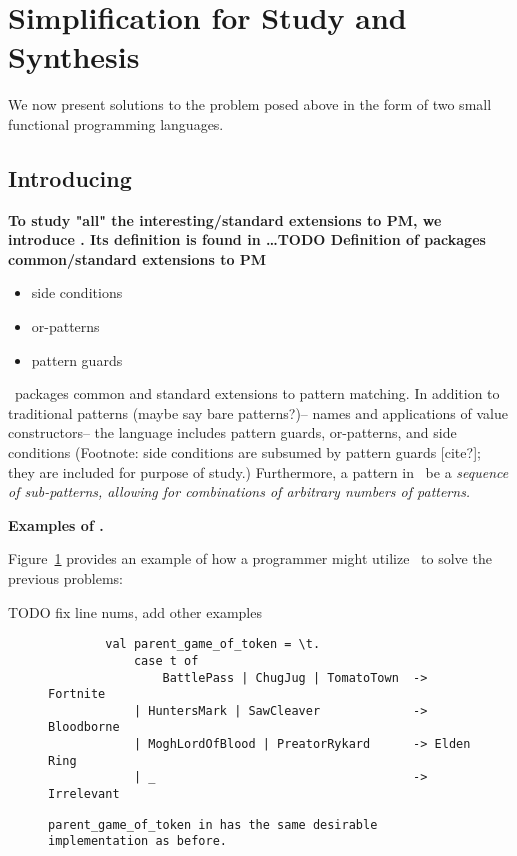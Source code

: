 \documentclass[manuscript,screen,review, 12pt]{acmart}
\begin{document}
\section{Simplification for Study and Synthesis}

We now present solutions to the problem posed above in the form of two small
functional programming languages. %

\subsection{Introducing \PPlus\ }

\begin{outline}[enumerate]
    \1 \bf{To study "all" the interesting/standard extensions to PM, we introduce}
    \PPlus. Its definition is found in \dots TODO 
    \2 \bf{Definition of \PPlus}
    \2 \bf{{\PPlus} packages common/standard extensions to PM}
    \begin{itemize}
        \item side conditions
        \item or-patterns 
        \item pattern guards 
    \end{itemize}

    \PPlus\ packages common and standard extensions to pattern matching. In
    addition to traditional patterns (maybe say bare patterns?)-- names and
    applications of value constructors-- the language includes pattern guards,
    or-patterns, and side conditions (Footnote: side conditions are subsumed by
    pattern guards [cite?]; they are included for purpose of study.)
    Furthermore, a pattern in \PPlus\ be a \it{sequence} of sub-patterns,
    allowing for combinations of arbitrary numbers of patterns. 
    
    \3 \bf{Examples of \PPlus. }

    Figure~\ref{fig:ppexs} provides an example of how a programmer might utilize
    \PPlus\ to solve the previous problems: 

    TODO fix line nums, add other examples 
    \begin{figure}
        \begin{center}
            \pplst 
            \begin{lstlisting}
        val parent_game_of_token = \t. 
            case t of  
                BattlePass | ChugJug | TomatoTown  -> Fortnite
            | HuntersMark | SawCleaver             -> Bloodborne
            | MoghLordOfBlood | PreatorRykard      -> Elden Ring
            | _                                    -> Irrelevant
        \end{lstlisting}
        \end{center}    
        \caption{\tt{parent\_game\_of\_token} in \PPlus has the same desirable
        implementation as before.} 
        \label{fig:ppexs}
        \end{figure}
    

\end{outline}
\end{document}
